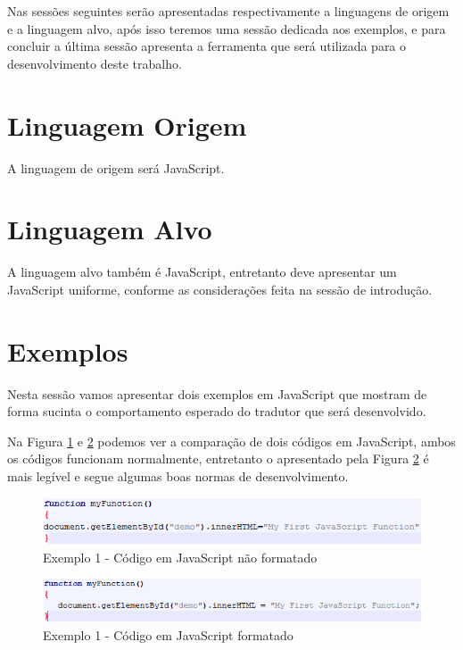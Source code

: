 \documentclass[12pt]{article}
\begin{document}
Nas sessões seguintes serão apresentadas respectivamente a linguagens de origem e a linguagem alvo, após isso teremos uma sessão dedicada aos exemplos, e para concluir a última sessão apresenta a ferramenta que será utilizada para o desenvolvimento deste trabalho.

\section{Linguagem Origem}
A linguagem de origem será JavaScript.

\section{Linguagem Alvo}
A linguagem alvo também é JavaScript, entretanto deve apresentar um JavaScript uniforme, conforme as considerações feita na sessão de introdução.

\newpage

\section{Exemplos}
Nesta sessão vamos apresentar dois exemplos em JavaScript que mostram de forma sucinta o comportamento esperado do tradutor que  será desenvolvido.

Na Figura \ref{fig:Exemplo 1 - Código em JavaScript não formatado} e \ref{fig:Exemplo 1 - Código em JavaScript formatado} podemos ver a comparação de dois códigos em JavaScript, ambos os códigos funcionam normalmente, entretanto o apresentado pela Figura \ref{fig:Exemplo 1 - Código em JavaScript formatado} é mais legível e segue algumas boas normas de desenvolvimento.
	
\begin{figure}[!htbp]
	\caption{Exemplo 1 - Código em JavaScript não formatado}
	\label{fig:Exemplo 1 - Código em JavaScript não formatado}
	\centering%
	\begin{minipage}{.8\textwidth}
		\includegraphics[width=\textwidth]{exemplo1}
	\end{minipage}
\end{figure}

\begin{figure}[!htbp]
	\caption{Exemplo 1 - Código em JavaScript formatado}
	\label{fig:Exemplo 1 - Código em JavaScript formatado}
	\centering%
	\begin{minipage}{.8\textwidth}
		\includegraphics[width=\textwidth]{exemplo1_ok}
	\end{minipage}
\end{figure}
\end{document}

